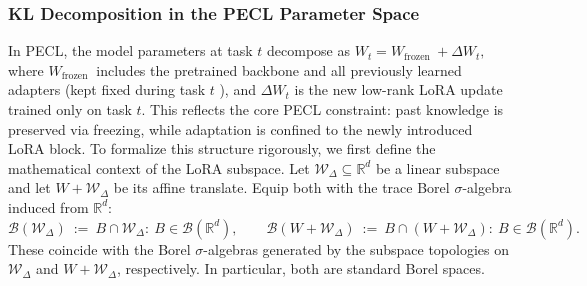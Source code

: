 \documentclass{article} %
\begin{document}


\subsubsection{KL Decomposition in the PECL Parameter Space}

In PECL, the model parameters at task $t$ decompose as
$
W_t=W_{\text {frozen }}+\Delta W_t,
$
where $W_{\text {frozen }}$ includes the pretrained backbone and all previously learned adapters (kept fixed during task $t$ ), and $\Delta W_t $ is the new low-rank LoRA update trained only on task $t$. This reflects the core PECL constraint: past knowledge is preserved via freezing, while adaptation is confined to the newly introduced LoRA block. 
To formalize this structure rigorously, we first define the mathematical context of the LoRA subspace. Let $\mathcal W_\Delta\subseteq\mathbb R^d$ be a linear subspace and let $W+\mathcal W_\Delta$ be its affine translate. Equip both with the trace Borel $\sigma$-algebra induced from $\mathbb R^d$:
$
\mathcal B(\mathcal W_\Delta)\ :=\ {B\cap \mathcal W_\Delta:\ B\in \mathcal B(\mathbb R^d)},\qquad
\mathcal B(W+\mathcal W_\Delta)\ :=\ {B\cap (W+\mathcal W_\Delta):\ B\in \mathcal B(\mathbb R^d)}.
$
These coincide with the Borel $\sigma$-algebras generated by the subspace topologies on $\mathcal W_\Delta$ and $W+\mathcal W_\Delta$, respectively. In particular, both are standard Borel spaces.







\end{document}
